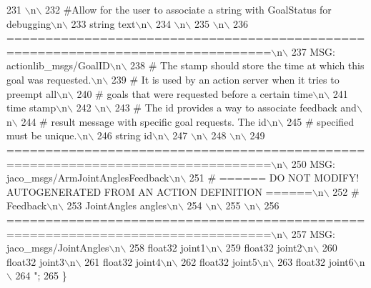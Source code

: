 \begin{DoxyCode}
231 \textcolor{stringliteral}{\(\backslash\)n\(\backslash\)}
232 \textcolor{stringliteral}{#Allow for the user to associate a string with GoalStatus for debugging\(\backslash\)n\(\backslash\)}
233 \textcolor{stringliteral}{string text\(\backslash\)n\(\backslash\)}
234 \textcolor{stringliteral}{\(\backslash\)n\(\backslash\)}
235 \textcolor{stringliteral}{\(\backslash\)n\(\backslash\)}
236 \textcolor{stringliteral}{================================================================================\(\backslash\)n\(\backslash\)}
237 \textcolor{stringliteral}{MSG: actionlib\_msgs/GoalID\(\backslash\)n\(\backslash\)}
238 \textcolor{stringliteral}{# The stamp should store the time at which this goal was requested.\(\backslash\)n\(\backslash\)}
239 \textcolor{stringliteral}{# It is used by an action server when it tries to preempt all\(\backslash\)n\(\backslash\)}
240 \textcolor{stringliteral}{# goals that were requested before a certain time\(\backslash\)n\(\backslash\)}
241 \textcolor{stringliteral}{time stamp\(\backslash\)n\(\backslash\)}
242 \textcolor{stringliteral}{\(\backslash\)n\(\backslash\)}
243 \textcolor{stringliteral}{# The id provides a way to associate feedback and\(\backslash\)n\(\backslash\)}
244 \textcolor{stringliteral}{# result message with specific goal requests. The id\(\backslash\)n\(\backslash\)}
245 \textcolor{stringliteral}{# specified must be unique.\(\backslash\)n\(\backslash\)}
246 \textcolor{stringliteral}{string id\(\backslash\)n\(\backslash\)}
247 \textcolor{stringliteral}{\(\backslash\)n\(\backslash\)}
248 \textcolor{stringliteral}{\(\backslash\)n\(\backslash\)}
249 \textcolor{stringliteral}{================================================================================\(\backslash\)n\(\backslash\)}
250 \textcolor{stringliteral}{MSG: jaco\_msgs/ArmJointAnglesFeedback\(\backslash\)n\(\backslash\)}
251 \textcolor{stringliteral}{# ====== DO NOT MODIFY! AUTOGENERATED FROM AN ACTION DEFINITION ======\(\backslash\)n\(\backslash\)}
252 \textcolor{stringliteral}{# Feedback\(\backslash\)n\(\backslash\)}
253 \textcolor{stringliteral}{JointAngles angles\(\backslash\)n\(\backslash\)}
254 \textcolor{stringliteral}{\(\backslash\)n\(\backslash\)}
255 \textcolor{stringliteral}{\(\backslash\)n\(\backslash\)}
256 \textcolor{stringliteral}{================================================================================\(\backslash\)n\(\backslash\)}
257 \textcolor{stringliteral}{MSG: jaco\_msgs/JointAngles\(\backslash\)n\(\backslash\)}
258 \textcolor{stringliteral}{float32 joint1\(\backslash\)n\(\backslash\)}
259 \textcolor{stringliteral}{float32 joint2\(\backslash\)n\(\backslash\)}
260 \textcolor{stringliteral}{float32 joint3\(\backslash\)n\(\backslash\)}
261 \textcolor{stringliteral}{float32 joint4\(\backslash\)n\(\backslash\)}
262 \textcolor{stringliteral}{float32 joint5\(\backslash\)n\(\backslash\)}
263 \textcolor{stringliteral}{float32 joint6\(\backslash\)n\(\backslash\)}
264 \textcolor{stringliteral}{"};
265   \}
\end{DoxyCode}
